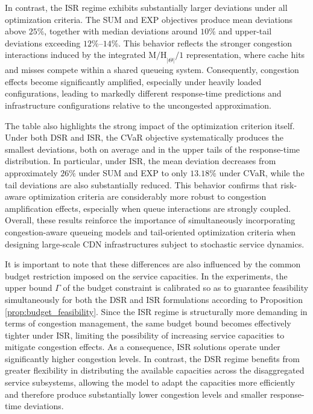 \documentclass[a4paper,11pt,reqno]{amsart}
\begin{document}
In contrast, the ISR regime exhibits substantially larger deviations under all optimization criteria. The SUM and EXP objectives produce mean deviations above $25\%$, together with median deviations around $10\%$ and upper-tail deviations exceeding $12\%$--$14\%$. This behavior reflects the stronger congestion interactions induced by the integrated $\mathrm{M/H}_{|\Theta|}/1$ representation, where cache hits and misses compete within a shared queueing system. Consequently, congestion effects become significantly amplified, especially under heavily loaded configurations, leading to markedly different response-time predictions and infrastructure configurations relative to the uncongested approximation.

The table also highlights the strong impact of the optimization criterion itself. Under both DSR and ISR, the CVaR objective systematically produces the smallest deviations, both on average and in the upper tails of the response-time distribution. In particular, under ISR, the mean deviation decreases from approximately $26\%$ under SUM and EXP to only $13.18\%$ under CVaR, while the tail deviations are also substantially reduced. This behavior confirms that risk-aware optimization criteria are considerably more robust to congestion amplification effects, especially when queue interactions are strongly coupled. Overall, these results reinforce the importance of simultaneously incorporating congestion-aware queueing models and tail-oriented optimization criteria when designing large-scale CDN infrastructures subject to stochastic service dynamics.

It is important to note that these differences are also influenced by the common budget restriction imposed on the service capacities. In the experiments, the upper bound $\Gamma$ of the budget constraint is calibrated so as to guarantee feasibility simultaneously for both the DSR and ISR formulations according to Proposition \ref{prop:budget_feasibility}. Since the ISR regime is structurally more demanding in terms of congestion management, the same budget bound becomes effectively tighter under ISR, limiting the possibility of increasing service capacities to mitigate congestion effects. As a consequence, ISR solutions operate under significantly higher congestion levels. In contrast, the DSR regime benefits from greater flexibility in distributing the available capacities across the disaggregated service subsystems, allowing the model to adapt the capacities more efficiently and therefore produce substantially lower congestion levels and smaller response-time deviations.
\end{document}
